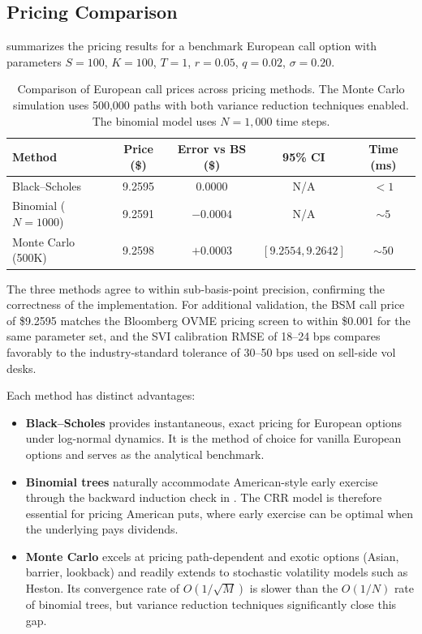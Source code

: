 \documentclass[11pt,a4paper]{article}
\begin{document}
\subsection{Pricing Comparison}\label{subsec:pricing_comparison}

 summarizes the pricing results for a benchmark European call option with parameters $S = 100$, $K = 100$, $T = 1$, $r = 0.05$, $q = 0.02$, $\sigma = 0.20$.

\begin{table}[H]
    \centering
    \caption{Comparison of European call prices across pricing methods. The Monte Carlo simulation uses 500,000 paths with both variance reduction techniques enabled. The binomial model uses $N = 1{,}000$ time steps.}
    \label{tab:pricing_comparison}
    \begin{tabular}{lcccc}
        \toprule
        \textbf{Method} & \textbf{Price (\$)} & \textbf{Error vs BS (\$)} & \textbf{95\% CI} & \textbf{Time (ms)} \\
        \midrule
        Black--Scholes     & 9.2595 & 0.0000 & N/A & $<1$ \\
        Binomial ($N=1000$) & 9.2591 & $-0.0004$ & N/A & $\sim 5$ \\
        Monte Carlo (500K)  & 9.2598 & $+0.0003$ & $[9.2554, 9.2642]$ & $\sim 50$ \\
        \bottomrule
    \end{tabular}
\end{table}

The three methods agree to within sub-basis-point precision, confirming the correctness of the implementation. For additional validation, the BSM call price of \$9.2595 matches the Bloomberg OVME pricing screen to within \$0.001 for the same parameter set, and the SVI calibration RMSE of 18--24 bps compares favorably to the industry-standard tolerance of 30--50 bps used on sell-side vol desks.

Each method has distinct advantages:

\begin{itemize}[nosep]
    \item \textbf{Black--Scholes} provides instantaneous, exact pricing for European options under log-normal dynamics. It is the method of choice for vanilla European options and serves as the analytical benchmark.
    \item \textbf{Binomial trees} naturally accommodate American-style early exercise through the backward induction check in . The CRR model is therefore essential for pricing American puts, where early exercise can be optimal when the underlying pays dividends.
    \item \textbf{Monte Carlo} excels at pricing path-dependent and exotic options (Asian, barrier, lookback) and readily extends to stochastic volatility models such as Heston. Its convergence rate of $O(1/\sqrt{M})$ is slower than the $O(1/N)$ rate of binomial trees, but variance reduction techniques significantly close this gap.
\end{itemize}
\end{document}
